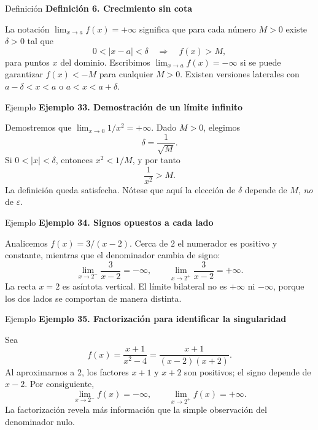 \documentclass[12pt,aspectratio=169]{beamer}
\begin{document}
\begin{frame}[t,allowframebreaks]{Definición}
{\color{azul}\bfseries Definición 6. Crecimiento sin cota}\par\medskip

La notación $\lim_{x\to a}f(x)=+\infty$ significa que para cada número $M>0$ existe $\delta>0$ tal que
\[
 0<|x-a|<\delta\quad\Longrightarrow\quad f(x)>M,
\]
para puntos $x$ del dominio. Escribimos $\lim_{x\to a}f(x)=-\infty$ si se puede garantizar $f(x)<-M$ para cualquier $M>0$. Existen versiones laterales con $a-\delta<x<a$ o $a<x<a+\delta$.
\end{frame}


\begin{frame}[t,allowframebreaks]{Ejemplo}
{\color{azul}\bfseries Ejemplo 33. Demostración de un límite infinito}\par\medskip

Demostremos que $\lim_{x\to0}1/x^2=+\infty$. Dado $M>0$, elegimos
\[
 \delta=\frac1{\sqrt M}.
\]
Si $0<|x|<\delta$, entonces $x^2<1/M$, y por tanto
\[
 \frac1{x^2}>M.
\]
La definición queda satisfecha. Nótese que aquí la elección de $\delta$ depende de $M$, \emph{no} de $\varepsilon$.
\end{frame}


\begin{frame}[t,allowframebreaks]{Ejemplo}
{\color{azul}\bfseries Ejemplo 34. Signos opuestos a cada lado}\par\medskip

Analicemos $f(x)=3/(x-2)$. Cerca de $2$ el numerador es positivo y constante, mientras que el denominador cambia de signo:
\[
 \lim_{x\to2^-}\frac3{x-2}=-\infty,\qquad
 \lim_{x\to2^+}\frac3{x-2}=+\infty.
\]
La recta $x=2$ es asíntota vertical. El límite bilateral no es $+\infty$ ni $-\infty$, porque los dos lados se comportan de manera distinta.
\end{frame}


\begin{frame}[t,allowframebreaks]{Ejemplo}
{\color{azul}\bfseries Ejemplo 35. Factorización para identificar la singularidad}\par\medskip

Sea
\[
 f(x)=\frac{x+1}{x^2-4}=\frac{x+1}{(x-2)(x+2)}.
\]
Al aproximarnos a $2$, los factores $x+1$ y $x+2$ son positivos; el signo depende de $x-2$. Por consiguiente,
\[
 \lim_{x\to2^-}f(x)=-\infty,\qquad \lim_{x\to2^+}f(x)=+\infty.
\]
La factorización revela más información que la simple observación del denominador nulo.
\end{frame}
\end{document}
